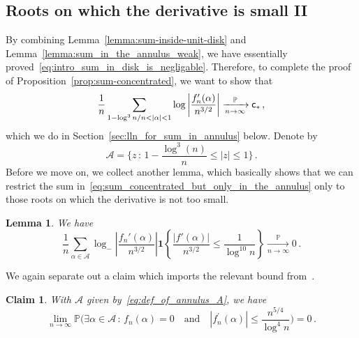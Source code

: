 \documentclass[11pt]{amsart}
\newtheorem{lemma}[theorem]{Lemma}
\newtheorem{claim}[theorem]{Claim}
\theoremstyle{remark}
\theoremstyle{definition}
\newcommand{\bP}{\mathbb P}
\newcommand{\one}{\boldsymbol{1}}
\begin{document}
    \subsection{Roots on which the derivative is small II}
        By combining Lemma~\ref{lemma:sum-inside-unit-disk} and Lemma~\ref{lemma:sum_in_the_annulus_weak}, we have essentially proved~\eqref{eq:intro_sum_in_disk_is_negligable}. Therefore, to complete the proof of Proposition~\ref{prop:sum-concentrated}, we want to show that
        \begin{equation}
        \label{eq:sum_concentrated_but_only_in_the_annulus}
        \frac{1}{n} \sum_{1- \log^3 n / n < |\alpha| < 1} \log \left| \frac{f_n'(\alpha)}{n^{3/2}}\right| \xrightarrow[n\to \infty]{\bP} {\sf c}_\ast \, , 
        \end{equation}
        which we do in Section~\ref{sec:lln_for_sum_in_annulus} below. Denote by
        \begin{equation}
            \label{eq:def_of_annulus_A}
            \mathcal{A} = \Big\{z\, : \, 1-\frac{\log^3(n)}{n} \le |z| \le 1 \Big\} \, .
        \end{equation}
        Before we move on, we collect another lemma, which basically shows that we can restrict the sum in~\eqref{eq:sum_concentrated_but_only_in_the_annulus} only to those roots on which the derivative is not too small. 
        \begin{lemma}\label{lemma:annulus-small-deriv-contribution}
        We have
        \begin{equation*}
            \frac{1}{n} \sum_{\alpha\in \mathcal{A}}\log_{-}\left|\frac{f_n'(\alpha)}{n^{3/2}} \right| \one\left\{\frac{|f'(\alpha)|}{n^{3/2}} \leq \frac{1}{\log^{10} n} \right\} \xrightarrow[n \to \infty]{\bP} 0 \, .
        \end{equation*}
    \end{lemma}
    We again separate out a claim which imports the relevant bound from~\cite{Michelen-Yakir-root-separation}. 
    \begin{claim}
        \label{claim:no_small_derivative_in_annulus}
        With $\mathcal{A}$ given by~\eqref{eq:def_of_annulus_A}, we have
        \[
        \lim_{n\to\infty} \bP\Big(\exists \alpha\in \mathcal{A} \, : \, f_n(\alpha) = 0 \quad  \text{and} \quad |f_n^\prime(\alpha)| \le \frac{n^{5/4}}{\log^4 n} \Big) = 0 \, .
        \]
    \end{claim}
\end{document}
